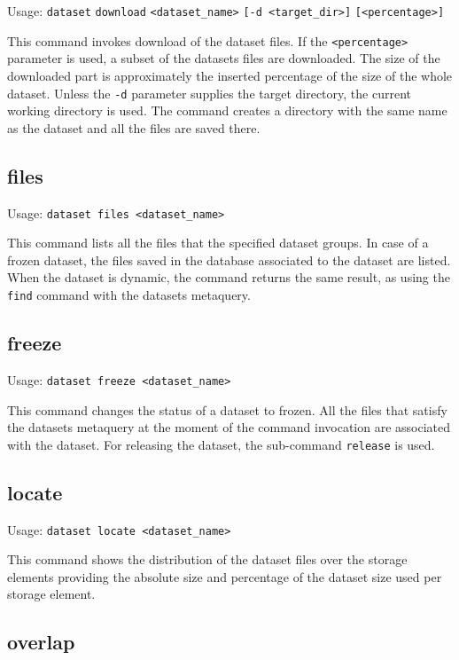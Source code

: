 Usage: \texttt{dataset} \texttt{download} \texttt{<dataset\_name>}
\texttt{[-d <target\_dir>]} \texttt{[<percentage>]}

This command invokes download of the dataset files. If the \texttt{<percentage>}
parameter is used, a subset of the datasets files are downloaded.
The size of the downloaded part is approximately the inserted percentage of the size
of the whole dataset.
Unless the \texttt{-d} parameter supplies the
target directory, the current working directory is used. The
command creates a directory with the same name as the dataset and
all the files are saved there.

\subsection{files}

Usage: \texttt{dataset files <dataset\_name>}

This command lists all the files that the specified dataset groups. In case
of a frozen dataset, the files saved in the database associated
to the dataset are listed. When the dataset is dynamic, the command
returns the same result, as using the \texttt{find} command with
the datasets metaquery.

\subsection{freeze}

Usage: \texttt{dataset freeze <dataset\_name>}

This command changes the status of a dataset to frozen. All the files that
satisfy the datasets metaquery at the moment of the command
invocation are associated with the dataset. For releasing the
dataset, the sub-command \texttt{release} is used.

\subsection{locate}

Usage: \texttt{dataset locate <dataset\_name>}

This command shows the distribution of the dataset files over the storage
elements providing the absolute size and percentage of the dataset
size used per storage element.

\subsection{overlap}

